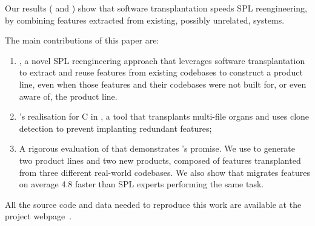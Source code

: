 Our results ( and  ) show that software transplantation speeds SPL reengineering, by combining features extracted from existing, possibly unrelated, systems.

The main contributions of this paper are: 
\begin{enumerate}
    \item \FOUNDRY, a novel SPL reengineering approach that leverages software transplantation to extract and reuse features from existing codebases to construct a product line, even when those features and their codebases were not built for, or even aware of, the product line.

    \item \FOUNDRY's realisation for C in \prodscalpel, a  tool that transplants multi-file organs and uses clone detection to prevent implanting redundant features;
    
   \item A rigorous evaluation of \prodscalpel that demonstrates \FOUNDRY's promise. We use \prodscalpel to generate two product lines and two new products, composed of features transplanted from three different real-world codebases. We also show that \prodscalpel migrates features on average 4.8 faster than SPL experts performing the same task.

\end{enumerate}

 All the source code and data needed to reproduce this work are available at the project webpage~\cite{ProjectWebpage}.



